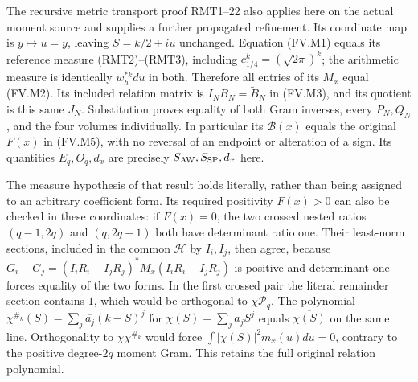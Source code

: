 The recursive metric transport proof RMT1--22 also applies here on the
actual moment source and supplies a further propagated refinement.
Its coordinate map is $y\mapsto u=y$, leaving $S=k/2+iu$ unchanged.
Equation (FV.M1) equals its reference measure (RMT2)--(RMT3), including
$c_{1/4}^k=(\sqrt{2\pi})^k$; the arithmetic measure is identically
$w_h^{*k}du$ in both. Therefore all entries of its $M_x$ equal (FV.M2).
Its included relation matrix is $I_NB_N=\widetilde B_N$ in (FV.M3),
and its quotient is this same $J_N$. Substitution proves equality of
both Gram inverses, every $P_N,Q_N$, and the four volumes individually.
In particular its $\mathcal B(x)$ equals the original $F(x)$ in (FV.M5),
with no reversal of an endpoint or alteration of a sign. Its quantities
$E_q,O_q,d_x$ are precisely $S_{\rm AW},S_{\rm SP},d_x$ here.

The measure hypothesis of that result holds literally, rather than being
assigned to an arbitrary coefficient form. Its required positivity
$F(x)>0$ can also be checked in these coordinates: if $F(x)=0$,
the two crossed nested ratios $(q-1,2q)$ and $(q,2q-1)$ both have
determinant ratio one. Their least-norm sections, included in the common
$\mathcal H$ by $I_i,I_j$, then agree, because
$G_i-G_j=(I_iR_i-I_jR_j)^*M_x(I_iR_i-I_jR_j)$ is positive and determinant one
forces equality of the two forms. In the first crossed pair the literal
remainder section contains $1$, which would be orthogonal to
$\chi\mathcal P_q$. The polynomial
$\chi^{\#_k}(S)=\sum_j\overline{a_j}(k-S)^j$ for
$\chi(S)=\sum_j a_jS^j$ equals $\overline{\chi(S)}$ on the same
line. Orthogonality to $\chi\chi^{\#_k}$ would force
$\int|\chi(S)|^2m_x(u)du=0$, contrary to the positive degree-$2q$
moment Gram. This retains the full original relation polynomial.

